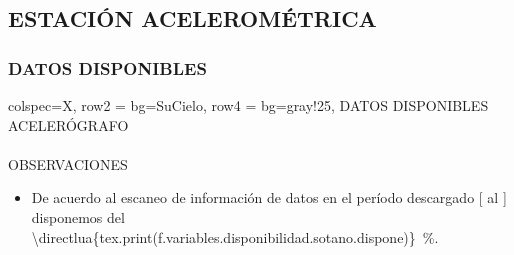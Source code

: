 \subsection{ESTACIÓN ACELEROMÉTRICA \MakeUppercase{}}
\subsubsection{DATOS DISPONIBLES}
\begin{tblr}[long]{
        colspec={X},
        row{2} = {bg=SuCielo},
        row{4} = {bg=gray!25},
    }
    DATOS DISPONIBLES \\
    ACELERÓGRAFO \MakeUppercase{} \\
     \\
    OBSERVACIONES \\
    \begin{itemize}
        \item De acuerdo al escaneo de información de datos en el período descargado [ al ] disponemos del \qty{\directlua{tex.print(f.variables.disponibilidad.sotano.dispone)}}{\percent}.
    \end{itemize}
\end{tblr}

